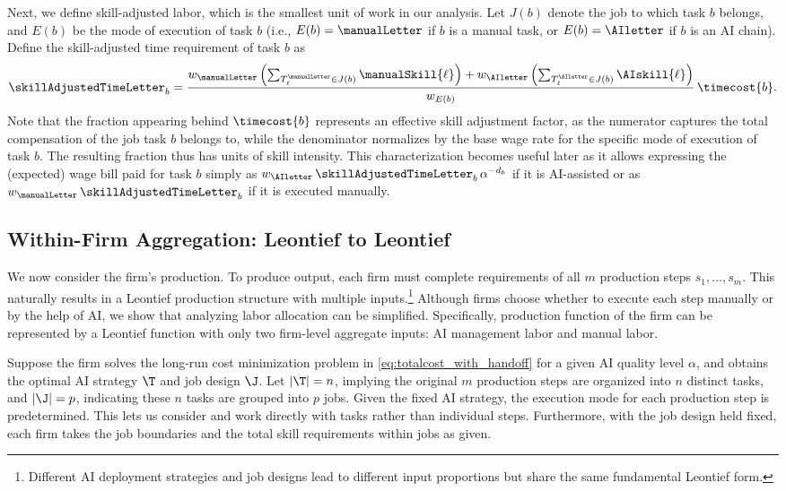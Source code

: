 Next, we define skill-adjusted labor, which is the smallest unit of work in our analysis.
Let $J(b)$ denote the job to which task $b$ belongs, and $E(b)$ be the mode of execution of task $b$ (i.e., $E(b) = \manualLetter$ if $b$ is a manual task, or $E(b) = \AIletter$ if $b$ is an AI chain).
Define the skill-adjusted time requirement of task $b$ as
\[
\skillAdjustedTimeLetter_b = \frac{w_{\manualLetter} \left(\sum_{T_{\ell}^{\manualLetter} \in J(b)} \manualSkill{\ell}\right) + w_{\AIletter} \left(\sum_{T_{\ell}^{\AIletter} \in J(b)} \AIskill{\ell}\right)}{w_{E(b)}} \, \timecost{b}.\label{eq:skill_adjusted_time}
\]
Note that the fraction appearing behind $\timecost{b}$ represents an effective skill adjustment factor, as the numerator captures the total compensation of the job task $b$ belongs to, while the denominator normalizes by the base wage rate for the specific mode of execution of task $b$.
The resulting fraction thus has units of skill intensity.
This characterization becomes useful later as it allows expressing the (expected) wage bill paid for task $b$ simply as $w_{\AIletter}\,\skillAdjustedTimeLetter_{b}\,\alpha^{-d_b}$ if it is AI-assisted or as $w_{\manualLetter}\,\skillAdjustedTimeLetter_{b}$ if it is executed manually.


\subsection{Within-Firm Aggregation: Leontief to Leontief}
\label{sec:agg_within}

We now consider the firm's production.
To produce output, each firm must complete requirements of all \( m \) production steps \( s_1, \ldots, s_m \).
This naturally results in a Leontief production structure with multiple inputs.\footnote{
Different AI deployment strategies and job designs lead to different input proportions but share the same fundamental Leontief form.
}
Although firms choose whether to execute each step manually or by the help of AI, we show that analyzing labor allocation can be simplified.
Specifically, production function of the firm can be represented by a Leontief function with only two firm-level aggregate inputs: AI management labor and manual labor.

Suppose the firm solves the long-run cost minimization problem in \eqref{eq:totalcost_with_handoff} for a given AI quality level $\alpha$, and obtains the optimal AI strategy \( \T \) and job design \( \J \).
Let \( |\T| = n \), implying the original \( m \) production steps are organized into \( n \) distinct tasks, and \( |\J| = p \), indicating these \( n \) tasks are grouped into \( p \) jobs.
Given the fixed AI strategy, the execution mode for each production step is predetermined. 
This lets us consider and work directly with tasks rather than individual steps.
Furthermore, with the job design held fixed, each firm takes the job boundaries and the total skill requirements within jobs as given.

